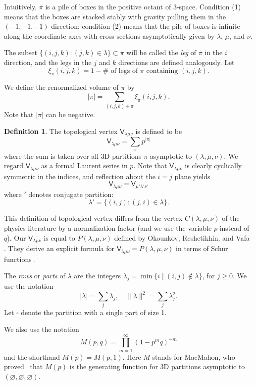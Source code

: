 \documentclass[12pt]{amsart}
\newcommand{\Vsf}{\mathsf{V}}
\newcommand{\bx}{\square}
\renewcommand{\emptyset}{\varnothing}
\theoremstyle{definition}
\newtheorem{defn}[theorem]{Definition}
\begin{document}
Intuitively, $\pi $ is a pile of boxes in the positive octant of
3-space.  Condition (1) means that the boxes are stacked stably with
gravity pulling them in the $(-1,-1,-1)$ direction; condition (2)
means that the pile of boxes is infinite along the coordinate axes
with cross-sections asymptotically given by $\lambda $, $\mu $, and
$\nu $.

The subset $\{(i,j,k ): (j,k)\in \lambda \}\subset \pi $ will be
called the \emph{leg} of $\pi $ in the $i$ direction, and the legs in
the $j$ and $k$ directions are defined analogously. Let
\begin{equation*}
\xi _{\pi } (i,j,k) = 1 - \# \text{ of legs of $\pi $ containing }
(i,j,k) .
\end{equation*}

We define the renormalized volume of $\pi $ by
\[
|\pi | = \sum _{(i,j,k)\in \pi } \xi _{\pi } (i,j,k).
\]
Note that $|\pi |$ can be negative.
\begin{defn}\label{defn: box counting vertex}
The topological vertex $\Vsf_{\lambda \mu \nu }$ is defined to be
\[
\Vsf _{\lambda \mu \nu }= \sum _{\pi } p^{|\pi |}
\]
where the sum is taken over all 3D partitions $\pi $ asymptotic to
$(\lambda ,\mu ,\nu )$. We regard $\Vsf _{\lambda \mu \nu }$ as a
formal Laurent series in $p$. Note that $\Vsf _{\lambda \mu \nu }$ is
clearly cyclically symmetric in the indices, and reflection about the
$i=j$ plane yields
\[
\Vsf _{\lambda \mu \nu } = \Vsf _{\mu '\lambda '\nu '}
\]
where $'$ denotes conjugate partition:
\[
\lambda ' = \{(i,j): (j,i)\in \lambda  \}.
\]

\end{defn}
This definition of topological vertex differs from the vertex $C
(\lambda ,\mu ,\nu )$ of the physics literature by a normalization
factor (and we use the variable $p$ instead of $q$). Our $\Vsf
_{\lambda \mu \nu }$ is equal to $P (\lambda ,\mu ,\nu )$ defined by
Okounkov, Reshetikhin, and Vafa \cite[eqn~3.16]{Ok-Re-Va}. They derive
an explicit formula for $\Vsf _{\lambda \mu \nu }=P (\lambda, \mu, \nu
)$ in terms of Schur functions \cite[eqns~3.20 and 3.21]{Ok-Re-Va}.



The \emph{rows} or \emph{parts} of $\lambda $
are the integers $\lambda _j = \min \{i \;|\;(i,j) \not \in \lambda
\}$, for $j \geq 0$. We use the notation
\[
|\lambda | = \sum_{j} \lambda_{j},\quad \| \lambda \| ^{2} =\sum_{j}\lambda_{j}^{2}.
\]
Let $\bx$ denote the partition with a single part of size 1.

We also use the notation
\[
M(p,q) = \prod_{m=1}^{\infty} (1-p^{m}q)^{-m}
\]
and the shorthand $M(p)=M(p,1)$.  Here $M$ stands for MacMahon, who proved~\cite{macmahon} that $M(p)$ is the generating function for 3D partitions asymptotic to $(\emptyset, \emptyset, \emptyset)$.
\end{document}
